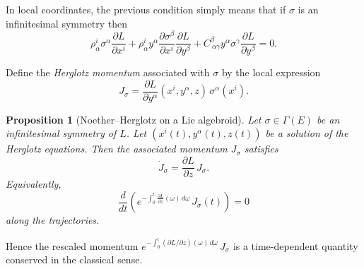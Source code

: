 \documentclass[11pt,a4paper]{article}
\newtheorem{proposition}[theorem]{Proposition}
\theoremstyle{definition}
\begin{document}
In local coordinates, the previous condition simply means that if $\sigma$ is an infinitesimal symmetry then
\begin{equation}\label{local:infinitesimal:symmetries}
    \rho^{i}_\alpha \sigma^{\alpha}\frac{\partial L}{\partial x^{i}} + \rho^{i}_\alpha y^{\alpha}\frac{\partial \sigma^{\beta}}{\partial x^{i}}\frac{\partial L}{\partial y^{\beta}} + C^\beta_{\ \alpha\gamma}y^\alpha\sigma^\gamma \frac{\partial L}{\partial y^{\beta}} = 0.
\end{equation}

Define the \emph{Herglotz momentum} associated with $\sigma$ by the local expression
\[
J_\sigma = \frac{\partial L}{\partial y^\alpha}(x^{i},y^{\alpha},z)\,\sigma^\alpha(x^{i}).
\]

\begin{proposition}[Noether--Herglotz on a Lie algebroid]
\label{prop:noether_herglotz}
Let $\sigma\in\Gamma(E)$ be an infinitesimal symmetry of $L$.
Let $(x^{i}(t),y^{\alpha}(t),z(t))$ be a solution of the Herglotz equations.
Then the associated momentum $J_\sigma$ satisfies
\begin{equation}\label{eq:J_balance}
\dot J_\sigma = \frac{\partial L}{\partial z}\,J_\sigma.
\end{equation}
Equivalently,
\[
\frac{d}{dt}\left(
e^{-\int_0^t \frac{\partial L}{\partial z}(\omega)\,d\omega}\,J_\sigma(t)
\right) = 0
\]
along the trajectories.
\end{proposition}

Hence the rescaled momentum 
$e^{-\int_0^t (\partial L/\partial z)(\omega)\,d\omega}\,J_\sigma$
is a time-dependent quantity conserved in the classical sense.
\end{document}

